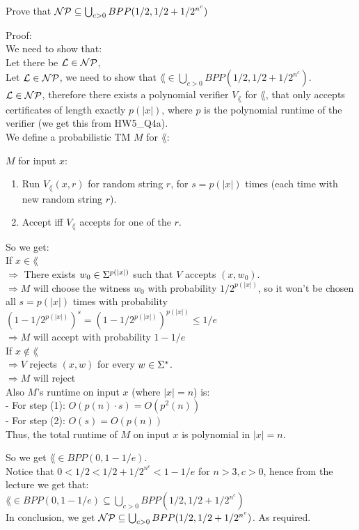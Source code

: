 Prove that $\mathcal{N}\mathcal{P} \subseteq \bigcup_{c>0} BPP(1/2, 1/2 + 1/2^{n^c})$

Proof: \\
We need to show that: \\
Let there be $\mathcal{L} \in \mathcal{N}\mathcal{P}$,  \\

Let $\mathcal{L} \in \mathcal{N}\mathcal{P}$, we need to show that $\lang \in \bigcup_{c>0} BPP(1/2, 1/2 + 1/2^{n^c})$. \\
$\mathcal{L} \in \mathcal{N}\mathcal{P}$, therefore there exists a polynomial verifier $V_\lang$ for $\lang$, that only accepts
certificates of length exactly $p(|x|)$, where $p$ is the polynomial runtime of the verifier
(we get this from HW5\_Q4a). \\
We define a probabilistic TM $M$ for $\lang$:

$M$ for input $x$:
\begin{enumerate}[1., itemsep=5pt]

    \item Run $V_\lang(x, r)$ for random string $r$, for $s=p(|x|)$ times (each time with new random string $r$).

    \item Accept iff $V_\lang$ accepts for one of the $r$.

\end{enumerate}

So we get: \\
If $x \in \lang$ \\
$\Rightarrow $ There exists $w_0 \in \Sigma^{p(|x|)}$ such that $V$ accepts $(x, w_0)$. \\
$\Rightarrow M$ will choose the witness $w_0$ with probability $1/2^{p(|x|)}$,
so it won't be chosen all $s=p(|x|)$ times with probability $(1 - 1/2^{p(|x|)})^s = (1 - 1/2^{p(|x|)})^{p(|x|)} \leq 1/e$ \\
$\Rightarrow M$ will accept with probability $1 - 1/e$ \\

If $x \notin \lang$ \\
$\Rightarrow V$ rejects $(x, w)$ for every $w \in \Sigma^*$. \\
$\Rightarrow M$ will reject\\

Also $M$'s runtime on input $x$ (where $|x|=n$) is: \\
- For step (1): $O(p(n) \cdot s) = O(p^2(n)) $  \\
- For step (2): $O(s) = O(p(n))$ \\
Thus, the total runtime of $M$ on input $x$ is polynomial in $|x|=n$.

So we get $\lang \in BPP(0, 1 - 1/e)$. \\
Notice that $0 < 1/2 < 1/2 + 1/2^{n^c} < 1 - 1/e$ for $n > 3, c > 0$, hence from the lecture we get that: \\
$\lang \in BPP(0, 1 - 1/e) \subseteq \bigcup_{c>0} BPP(1/2, 1/2 + 1/2^{n^c})$ \\
In conclusion, we get $\mathcal{N}\mathcal{P} \subseteq \bigcup_{c>0} BPP(1/2, 1/2 + 1/2^{n^c})$. As required.



